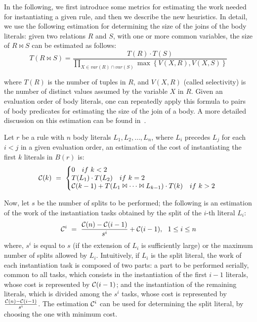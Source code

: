 \documentclass[preprint]{tlp}
\begin{document}
In the following, we first introduce some metrics for estimating the
work needed for instantiating a given rule, and then we describe the
new heuristics.
In detail, we use the following estimation for determining
the size of the joins of the body literals: given two relations $R$ and $S$,
with one or more common variables, the size of $R \Join S$ can be estimated
as follows:
\begin{equation}
\label{eq_1}
T\left(R \Join S \right) = \frac{T\left( R\right) \cdotp T\left( S\right)} {\prod _{X \in var\left(R \right) \cap var\left(S \right)} \max \left\lbrace V\left(X,R \right),V\left(X,S\right)\right\rbrace }
\end{equation}


\noindent where $T\left(R \right) $ is the number of tuples in $R$,
and $V\left(X,R \right) $ (called selectivity) is the number of distinct values
assumed by the variable $X$ in $R$. Given an evaluation order of body literals,
one can repeatedly apply this formula to pairs of body predicates
for estimating the size of the join of a body.
A more detailed discussion on this estimation can be found in~\cite{ullm-89}.

Let $r$ be a rule with $n$ body literals $L_1,L_2, \dots ,L_n$,
where $L_i$ precedes $L_j$ for each $i<j$ in a given evaluation order,
an estimation of the cost of instantiating the first $k$ literals in $B(r)$ is:
\begin{equation}
\label{eq_2}
{\cal C}(k) \ = \
\left\{
\begin{array}{@{}l@{}}
0 \ \ \ if \ k < 2\\
T(L_1) \cdot T(L_2) \ \ \ if \ k = 2\\
{\cal C}(k-1) + T(L_1 \Join \dots \Join L_{k-1}) \cdot T(k)\ \ \ if \ k>2\\
\end{array}
\ \right.
\end{equation}

Now, let $s$ be the number of splits to be performed; the following is
an estimation of the work of the instantiation tasks obtained by the split of the $i$-th literal $L_i$:
\begin{equation}
\label{eq_3}
{\cal C}^i \ = \ \frac{{\cal C}(n)-{\cal C}(i-1)}{s^i} +{\cal C}(i-1), \ \ 1\leq i \leq n
\end{equation}
where, $s^i$ is  equal to $s$ (if the extension of $L_i$ is sufficiently large) or the maximum number of splits allowed by $L_i$.
Intuitively, if $L_i$ is the split literal, the work of each instantiation task is composed of two parts:
a part to be performed serially, common to all tasks, which consists in the instantiation of the first $i-1$ literals,
whose cost is represented by ${\cal C}(i-1)$;
and the instantiation of the remaining literals, which is divided among the $s^i$ tasks, whose cost is represented by
$\frac{{\cal C}(n)-{\cal C}(i-1)}{s^i}$.
The estimation ${\cal C}^i$ can be used for determining the split literal, by choosing the one with minimum cost.
\end{document}
